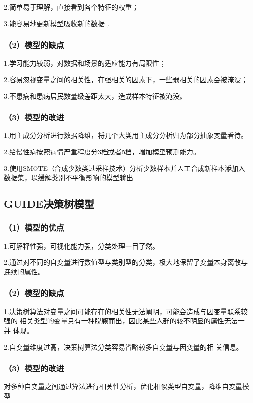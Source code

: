 \documentclass{article}
\numberwithin{equation}{subsection}
\begin{document}
2.简单易于理解，直接看到各个特征的权重；

3.能容易地更新模型吸收新的数据；
\subsubsection*{（2）模型的缺点}
1.学习能力较弱，对数据和场景的适应能力有局限性；

2.容易忽视变量之间的相关性，在强相关的因素下，一些弱相关的因素会被淹没；

3.不患病和患病居民数量级差距太大，造成样本特征被淹没。
\subsubsection*{（3）模型的改进}
1.用主成分分析进行数据降维，将几个大类用主成分分析归为部分抽象变量看待。

2.给慢性病按照病情严重程度分3档或者5档，增加模型预测能力。

3.使用SMOTE（合成少数类过采样技术）分析少数样本并人工合成新样本添加入数据集，以缓解类别不平衡影响的模型输出

\subsection{GUIDE决策树模型}
\subsubsection*{（1）模型的优点}
1.可解释性强，可视化能力强，分类处理一目了然。

2.通过对不同的自变量进行数值型与类别型的分类，极大地保留了变量本身离散与连续的属性。

\subsubsection*{（2）模型的缺点}
1.决策树算法对变量之间可能存在的相关性无法阐明，可能会造成与因变量联系较强的
相关类型的变量只有一种脱颖而出，因此某些人群的较不明显的属性无法一并
体现。

2.自变量维度过高，决策树算法分类容易省略较多自变量与因变量的相
关信息。 
\subsubsection*{（3）模型的改进}
对多种自变量之间通过算法进行相关性分析，优化相似类型自变量，降维自变量模型
\end{document}
